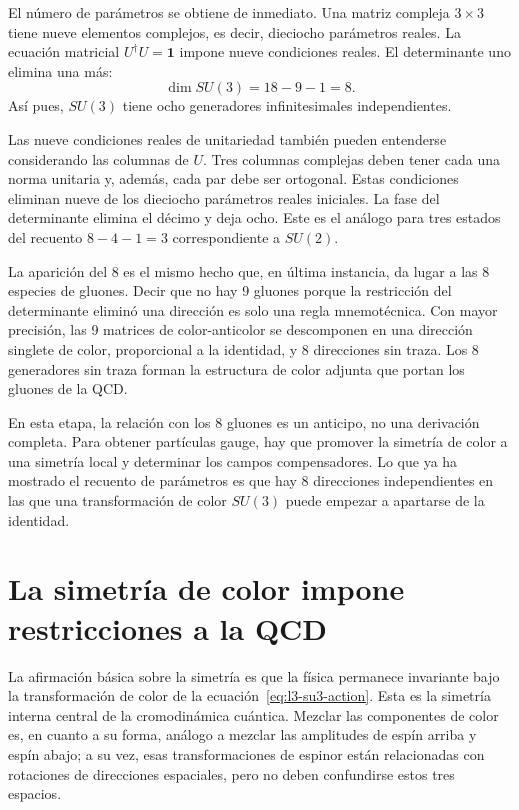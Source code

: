 El número de parámetros se obtiene de inmediato. Una matriz compleja \(3\times3\) tiene nueve elementos complejos, es decir, dieciocho parámetros reales. La ecuación matricial \(U^\dagger U=\boldsymbol 1\) impone nueve condiciones reales. El determinante uno elimina una más:
\begin{equation}
\dim SU(3)=18-9-1=8.
\end{equation}
Así pues, \(SU(3)\) tiene ocho generadores infinitesimales independientes.

Las nueve condiciones reales de unitariedad también pueden entenderse considerando las columnas de \(U\). Tres columnas complejas deben tener cada una norma unitaria y, además, cada par debe ser ortogonal. Estas condiciones eliminan nueve de los dieciocho parámetros reales iniciales. La fase del determinante elimina el décimo y deja ocho. Este es el análogo para tres estados del recuento \(8-4-1=3\) correspondiente a \(SU(2)\).

La aparición del 8 es el mismo hecho que, en última instancia, da lugar a las 8 especies de gluones. Decir que no hay 9 gluones porque la restricción del determinante eliminó una dirección es solo una regla mnemotécnica. Con mayor precisión, las 9 matrices de color-anticolor se descomponen en una dirección singlete de color, proporcional a la identidad, y 8 direcciones sin traza. Los 8 generadores sin traza forman la estructura de color adjunta que portan los gluones de la QCD.

En esta etapa, la relación con los 8 gluones es un anticipo, no una derivación completa. Para obtener partículas gauge, hay que promover la simetría de color a una simetría local y determinar los campos compensadores. Lo que ya ha mostrado el recuento de parámetros es que hay 8 direcciones independientes en las que una transformación de color \(SU(3)\) puede empezar a apartarse de la identidad.

\section{La simetría de color impone restricciones a la QCD}

La afirmación básica sobre la simetría es que la física permanece invariante bajo la transformación de color de la ecuación~\eqref{eq:l3-su3-action}. Esta es la simetría interna central de la cromodinámica cuántica. Mezclar las componentes de color es, en cuanto a su forma, análogo a mezclar las amplitudes de espín arriba y espín abajo; a su vez, esas transformaciones de espinor están relacionadas con rotaciones de direcciones espaciales, pero no deben confundirse estos tres espacios.

